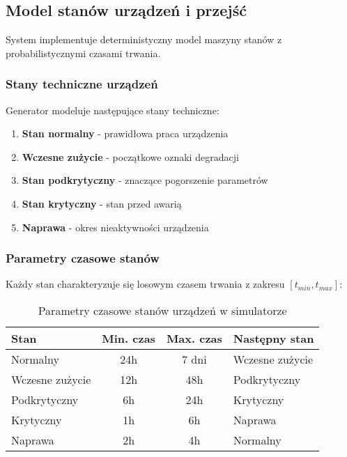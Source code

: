 \subsection{Model stanów urządzeń i przejść}
\label{subsec:model_stanow}

System implementuje deterministyczny model maszyny stanów z probabilistycznymi czasami trwania.

\subsubsection{Stany techniczne urządzeń}

Generator modeluje następujące stany techniczne:

\begin{enumerate}
    \item \textbf{Stan normalny} - prawidłowa praca urządzenia
    \item \textbf{Wczesne zużycie} - początkowe oznaki degradacji
    \item \textbf{Stan podkrytyczny} - znaczące pogorszenie parametrów
    \item \textbf{Stan krytyczny} - stan przed awarią
    \item \textbf{Naprawa} - okres nieaktywności urządzenia
\end{enumerate}

\subsubsection{Parametry czasowe stanów}

Każdy stan charakteryzuje się losowym czasem trwania z zakresu $[t_{min}, t_{max}]$:

\begin{table}[h]
\centering
\begin{tabular}{|l|c|c|l|}
\hline
\textbf{Stan} & \textbf{Min. czas} & \textbf{Max. czas} & \textbf{Następny stan} \\
\hline
Normalny & 24h & 7 dni & Wczesne zużycie \\
Wczesne zużycie & 12h & 48h & Podkrytyczny \\
Podkrytyczny & 6h & 24h & Krytyczny \\
Krytyczny & 1h & 6h & Naprawa \\
Naprawa & 2h & 4h & Normalny \\
\hline
\end{tabular}
\caption{Parametry czasowe stanów urządzeń w simulatorze}
\label{tab:parametry_stanow_sim}
\end{table}

